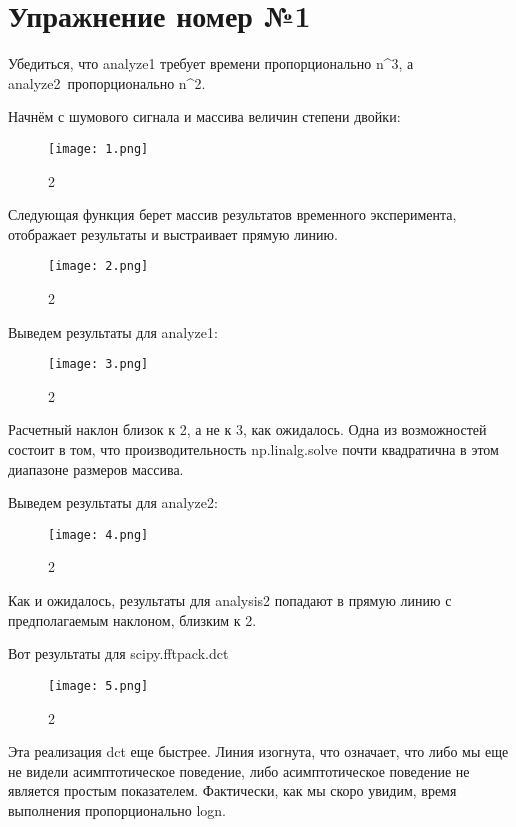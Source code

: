 \documentclass[10pt,a4paper,oneside]{article}
\begin{document}
\section{Упражнение номер №1}

Убедиться, что analyze1 требует времени пропорционально n^3, а analyze2 пропорционально n^2.

Начнём с шумового сигнала и массива величин степени двойки:

\begin{figure}[H]
        \centering
        \texttt{[image: 1.png]}
        \caption{2}
        \label{fig:first}
\end{figure}

Следующая функция берет массив результатов временного эксперимента, отображает результаты и выстраивает прямую линию.

\begin{figure}[H]
        \centering
        \texttt{[image: 2.png]}
        \caption{2}
        \label{fig:first}
\end{figure}

Выведем результаты для analyze1:

\begin{figure}[H]
        \centering
        \texttt{[image: 3.png]}
        \caption{2}
        \label{fig:first}
\end{figure}

Расчетный наклон близок к 2, а не к 3, как ожидалось. Одна из возможностей состоит в том, что производительность np.linalg.solve почти квадратична в этом диапазоне размеров массива.

Выведем результаты для analyze2:

\begin{figure}[H]
        \centering
        \texttt{[image: 4.png]}
        \caption{2}
        \label{fig:first}
\end{figure}

Как и ожидалось, результаты для analysis2 попадают в прямую линию с предполагаемым наклоном, близким к 2.

Вот результаты для scipy.fftpack.dct

\begin{figure}[H]
        \centering
        \texttt{[image: 5.png]}
        \caption{2}
        \label{fig:first}
\end{figure}

Эта реализация dct еще быстрее. Линия изогнута, что означает, что либо мы еще не видели асимптотическое поведение, либо асимптотическое поведение не является простым показателем. Фактически, как мы скоро увидим, время выполнения пропорционально logn.
\end{document}
